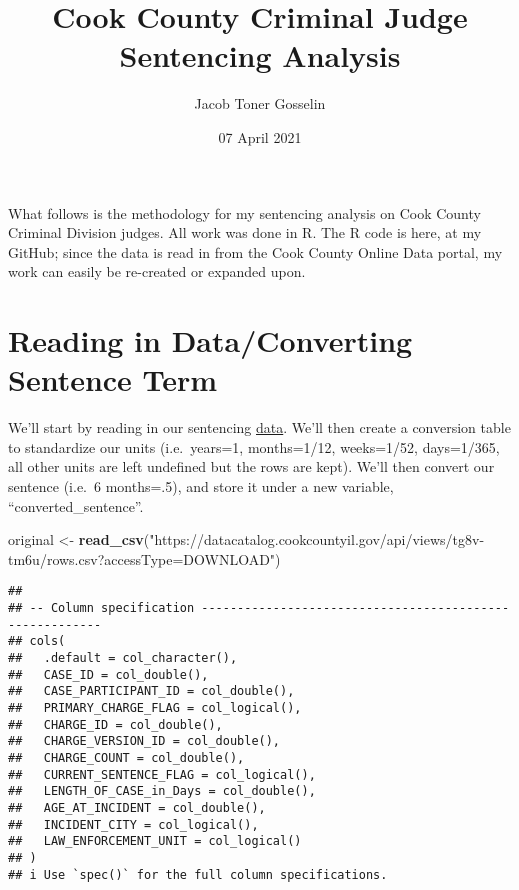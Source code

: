 \documentclass[
]{article}
\title{Cook County Criminal Judge Sentencing Analysis}
\author[]{Jacob Toner Gosselin}
\date{07 April 2021}
\newenvironment{Shaded}{\begin{snugshade}}{\end{snugshade}}
\newcommand{\KeywordTok}[1]{\textcolor[rgb]{0.13,0.29,0.53}{\textbf{#1}}}
\newcommand{\NormalTok}[1]{#1}
\newcommand{\StringTok}[1]{\textcolor[rgb]{0.31,0.60,0.02}{#1}}
\begin{document}
\maketitle

{
\hypersetup{linkcolor=}
\setcounter{tocdepth}{2}
\tableofcontents
}
What follows is the methodology for my sentencing analysis on Cook
County Criminal Division judges. All work was done in R. The R code is
here, at my GitHub; since the data is read in from the Cook County
Online Data portal, my work can easily be re-created or expanded upon.

\hypertarget{reading-in-dataconverting-sentence-term}{%
\section{Reading in Data/Converting Sentence
Term}\label{reading-in-dataconverting-sentence-term}}

We'll start by reading in our sentencing
\href{https://datacatalog.cookcountyil.gov/Courts/Sentencing/tg8v-tm6u}{data}.
We'll then create a conversion table to standardize our units
(i.e.~years=1, months=1/12, weeks=1/52, days=1/365, all other units are
left undefined but the rows are kept). We'll then convert our sentence
(i.e.~6 months=.5), and store it under a new variable,
``converted\_sentence''.

\begin{Shaded}
\begin{Highlighting}[]
\NormalTok{original <-}\StringTok{ }\KeywordTok{read_csv}\NormalTok{(}\StringTok{"https://datacatalog.cookcountyil.gov/api/views/tg8v-tm6u/rows.csv?accessType=DOWNLOAD"}\NormalTok{)}
\end{Highlighting}
\end{Shaded}

\begin{verbatim}
## 
## -- Column specification --------------------------------------------------------
## cols(
##   .default = col_character(),
##   CASE_ID = col_double(),
##   CASE_PARTICIPANT_ID = col_double(),
##   PRIMARY_CHARGE_FLAG = col_logical(),
##   CHARGE_ID = col_double(),
##   CHARGE_VERSION_ID = col_double(),
##   CHARGE_COUNT = col_double(),
##   CURRENT_SENTENCE_FLAG = col_logical(),
##   LENGTH_OF_CASE_in_Days = col_double(),
##   AGE_AT_INCIDENT = col_double(),
##   INCIDENT_CITY = col_logical(),
##   LAW_ENFORCEMENT_UNIT = col_logical()
## )
## i Use `spec()` for the full column specifications.
\end{verbatim}
\end{document}
